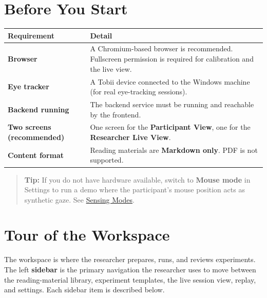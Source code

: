 \FloatBarrier
\section{Before You Start}\label{2-before-you-start}

{\small{} %
\begin{longtable}[]{@{}
  >{\raggedright\arraybackslash}p{}
  >{\raggedright\arraybackslash}p{}@{}}
\toprule\noalign{}
\begin{minipage}[b]{\linewidth}\raggedright
Requirement
\end{minipage} & \begin{minipage}[b]{\linewidth}\raggedright
Detail
\end{minipage} \\
\midrule\noalign{}
\endhead
\bottomrule\noalign{}
\endlastfoot
\textbf{Browser} & A Chromium-based browser is recommended. Fullscreen permission is required for calibration and the live view. \\
\textbf{Eye tracker} & A Tobii device connected to the Windows machine (for real eye-tracking sessions). \\
\textbf{Backend running} & The backend service must be running and reachable by the frontend. \\
\textbf{Two screens (recommended)} & One screen for the \textbf{Participant View}, one for the \textbf{Researcher Live View}. \\
\textbf{Content format} & Reading materials are \textbf{Markdown only}. PDF is not supported. \\
\end{longtable}
}

\begin{quote}
\textbf{Tip:} If you do not have hardware available, switch to \textbf{Mouse mode} in Settings to run a
demo where the participant's mouse position acts as synthetic gaze. See
\hyperref[7-sensing-modes-explained]{Sensing Modes}.
\end{quote}

\FloatBarrier
\section{Tour of the Workspace}\label{3-tour-of-the-workspace}

The workspace is where the researcher prepares, runs, and reviews experiments. The left
\textbf{sidebar} is the primary navigation the researcher uses to move between the reading-material
library, experiment templates, the live session view, replay, and settings. Each sidebar item is
described below.

